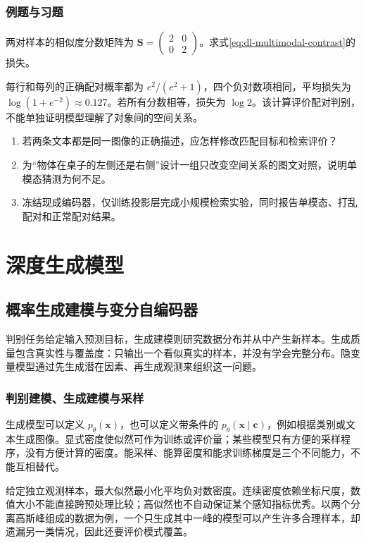 \documentclass[UTF8,12pt,a4paper,fontset=fandol]{ctexbook}
\begin{document}
\section{例题与习题}
\begin{example}[对称图文匹配]
两对样本的相似度分数矩阵为 $\mathbf S=\left(\begin{smallmatrix}2&0\\0&2\end{smallmatrix}\right)$。求式\eqref{eq:dl-multimodal-contrast}的损失。
\end{example}
\begin{solve}
每行和每列的正确配对概率都为 $e^2/(e^2+1)$，四个负对数项相同，平均损失为 $\log(1+e^{-2})\approx0.127$。若所有分数相等，损失为 $\log2$。该计算评价配对判别，不能单独证明模型理解了对象间的空间关系。
\end{solve}
\begin{enumerate}
\item 若两条文本都是同一图像的正确描述，应怎样修改匹配目标和检索评价？
\item 为“物体在桌子的左侧还是右侧”设计一组只改变空间关系的图文对照，说明单模态猜测为何不足。
\item 冻结现成编码器，仅训练投影层完成小规模检索实验，同时报告单模态、打乱配对和正常配对结果。
\end{enumerate}

\part{深度生成模型}

\chapter{概率生成建模与变分自编码器}
\label{chap:dl-vae}
判别任务给定输入预测目标，生成建模则研究数据分布并从中产生新样本。生成质量包含真实性与覆盖度：只输出一个看似真实的样本，并没有学会完整分布。隐变量模型通过先生成潜在因素、再生成观测来组织这一问题。

\section{判别建模、生成建模与采样}
生成模型可以定义 $p_\theta(\mathbf x)$，也可以定义带条件的 $p_\theta(\mathbf x\mid\mathbf c)$，例如根据类别或文本生成图像。显式密度使似然可作为训练或评价量；某些模型只有方便的采样程序，没有方便计算的密度。能采样、能算密度和能求训练梯度是三个不同能力，不能互相替代。

给定独立观测样本，最大似然最小化平均负对数密度。连续密度依赖坐标尺度，数值大小不能直接跨预处理比较；高似然也不自动保证某个感知指标优秀。以两个分离高斯峰组成的数据为例，一个只生成其中一峰的模型可以产生许多合理样本，却遗漏另一类情况，因此还要评价模式覆盖。
\end{document}
